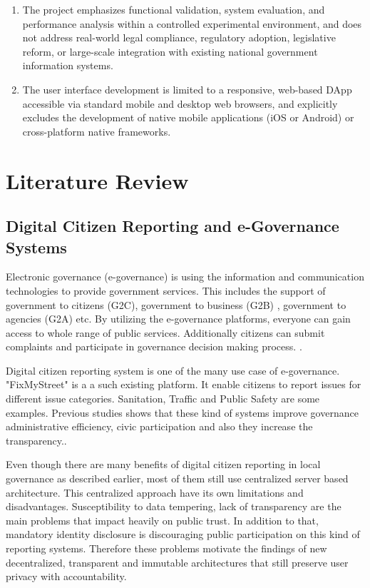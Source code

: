 \begin{enumerate}
   \item The project emphasizes functional validation, system evaluation, and performance analysis within a controlled experimental environment, and does not address real-world legal compliance, regulatory adoption, legislative reform, or large-scale integration with existing national government information systems.

   \item The user interface development is limited to a responsive, web-based \ac{DApp} accessible via standard mobile and desktop web browsers, and explicitly excludes the development of native mobile applications (iOS or Android) or cross-platform native frameworks.

\end{enumerate}


\section{Literature Review}

\subsection{Digital Citizen Reporting and e-Governance Systems}

Electronic governance (e-governance) is using the information and communication technologies to provide government services. This includes the support of government to citizens (G2C), government to business (G2B) , government to agencies (G2A) etc. By utilizing the e-governance platforms, everyone can gain access to whole range of public services. Additionally citizens can submit complaints and participate in governance decision making process. \cite{9587836}.

Digital citizen reporting system is one of the many use case of e-governance. "FixMyStreet" is a a such existing platform. It enable citizens to report issues for different issue categories. Sanitation, Traffic and Public Safety are some examples. Previous studies shows that these kind of systems improve governance administrative efficiency, civic participation and also they increase the transparency.\cite{oliveira2020smartcities}.

Even though there are many benefits of digital citizen reporting in local governance as described earlier, most of them still use centralized server based architecture. This centralized approach have its own limitations and  disadvantages. Susceptibility to data tempering, lack of transparency are the main problems that impact heavily on public trust. In addition to that, mandatory identity disclosure is discouraging public participation on this kind of reporting systems. Therefore these problems motivate the findings of new decentralized, transparent and immutable architectures that still preserve user privacy with accountability.

